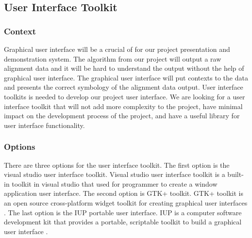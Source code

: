 


\subsection{User Interface Toolkit}
\subsubsection{Context}
Graphical user interface will be a crucial of for our project presentation and demonstration system. The algorithm from our project will output a raw alignment data and it will be hard to understand the output without the help of graphical user interface. The graphical user interface will put contexts to the data and presents the correct symbology of the alignment data output. User interface toolkits is needed to develop our project user interface. We are looking for a user interface toolkit that will not add more complexity to the project, have minimal impact on the development process of the project, and have a useful library for user interface functionality. \\

\subsubsection{Options}
There are three options for the user interface toolkit. The first option is the visual studio user interface toolkit. Visual studio user interface toolkit is a built-in toolkit in visual studio that used for programmer to create a window application user interface. The second option is GTK+ toolkit. GTK+ toolkit is an open source cross-platform widget toolkit for creating graphical user interfaces \cite{gtk}. The last option is the IUP portable user interface. IUP is a computer software development kit that provides a portable, scriptable toolkit to build a graphical user interface \cite{iup}. \\


